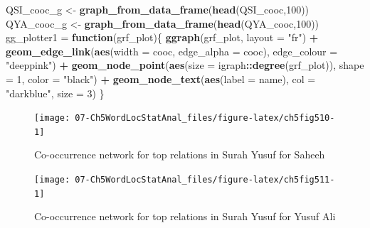 \documentclass[
]{article}
\newenvironment{Shaded}{\begin{snugshade}}{\end{snugshade}}
\newcommand{\AttributeTok}[1]{\textcolor[rgb]{0.13,0.29,0.53}{#1}}
\newcommand{\ControlFlowTok}[1]{\textcolor[rgb]{0.13,0.29,0.53}{\textbf{#1}}}
\newcommand{\DecValTok}[1]{\textcolor[rgb]{0.00,0.00,0.81}{#1}}
\newcommand{\FunctionTok}[1]{\textcolor[rgb]{0.13,0.29,0.53}{\textbf{#1}}}
\newcommand{\NormalTok}[1]{#1}
\newcommand{\OtherTok}[1]{\textcolor[rgb]{0.56,0.35,0.01}{#1}}
\newcommand{\SpecialCharTok}[1]{\textcolor[rgb]{0.81,0.36,0.00}{\textbf{#1}}}
\newcommand{\StringTok}[1]{\textcolor[rgb]{0.31,0.60,0.02}{#1}}
\begin{document}
\begin{Shaded}
\begin{Highlighting}[]
\NormalTok{QSI\_cooc\_g }\OtherTok{\textless{}{-}} \FunctionTok{graph\_from\_data\_frame}\NormalTok{(}\FunctionTok{head}\NormalTok{(QSI\_cooc,}\DecValTok{100}\NormalTok{))}
\NormalTok{QYA\_cooc\_g }\OtherTok{\textless{}{-}} \FunctionTok{graph\_from\_data\_frame}\NormalTok{(}\FunctionTok{head}\NormalTok{(QYA\_cooc,}\DecValTok{100}\NormalTok{))}
\NormalTok{gg\_plotter1 }\OtherTok{=} \ControlFlowTok{function}\NormalTok{(grf\_plot)\{}
  \FunctionTok{ggraph}\NormalTok{(grf\_plot, }\AttributeTok{layout =} \StringTok{"fr"}\NormalTok{) }\SpecialCharTok{+}
  \FunctionTok{geom\_edge\_link}\NormalTok{(}\FunctionTok{aes}\NormalTok{(}\AttributeTok{width =}\NormalTok{ cooc, }\AttributeTok{edge\_alpha =}\NormalTok{ cooc), }
                 \AttributeTok{edge\_colour =} \StringTok{"deeppink"}\NormalTok{) }\SpecialCharTok{+}
  \FunctionTok{geom\_node\_point}\NormalTok{(}\FunctionTok{aes}\NormalTok{(}\AttributeTok{size =}\NormalTok{ igraph}\SpecialCharTok{::}\FunctionTok{degree}\NormalTok{(grf\_plot)), }\AttributeTok{shape =} \DecValTok{1}\NormalTok{, }
                  \AttributeTok{color =} \StringTok{"black"}\NormalTok{) }\SpecialCharTok{+}
  \FunctionTok{geom\_node\_text}\NormalTok{(}\FunctionTok{aes}\NormalTok{(}\AttributeTok{label =}\NormalTok{ name), }\AttributeTok{col =} \StringTok{"darkblue"}\NormalTok{, }\AttributeTok{size =} \DecValTok{3}\NormalTok{) }
\NormalTok{\}}
\end{Highlighting}
\end{Shaded}

\normalsize

\begin{figure}

{\centering \texttt{[image: 07-Ch5WordLocStatAnal\_files/figure-latex/ch5fig510-1]} 

}

\caption{Co-occurrence network for top relations in Surah Yusuf for Saheeh}\label{fig:ch5fig510}
\end{figure}

\begin{figure}

{\centering \texttt{[image: 07-Ch5WordLocStatAnal\_files/figure-latex/ch5fig511-1]} 

}

\caption{Co-occurrence network for top relations in Surah Yusuf for Yusuf Ali}\label{fig:ch5fig511}
\end{figure}
\end{document}
